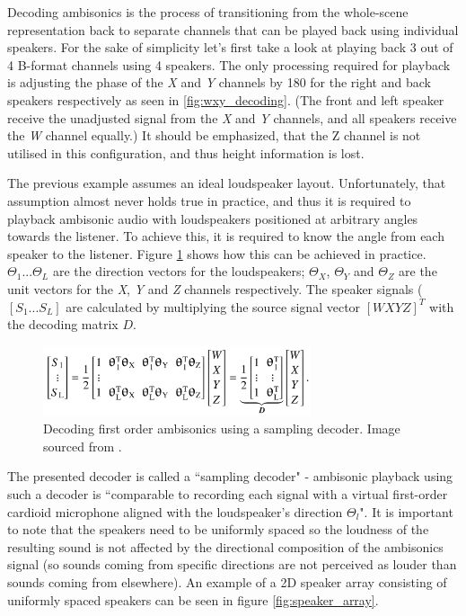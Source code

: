 Decoding ambisonics is the process of transitioning from the whole-scene representation 
back to separate channels that can be played back using individual speakers.
For the sake of simplicity let's first take a look at playing back 3 out of 4 B-format channels using 4 speakers. 
The only processing required for playback is adjusting the phase of the \emph{X} and \emph{Y} channels by 180\degree{} 
for the right and back speakers respectively as seen in \ref{fig:wxy_decoding}. 
(The front and left speaker receive the unadjusted signal from the \emph{X} and \emph{Y} channels, and all speakers receive the \emph{W} channel equally.)
It should be emphasized, that the Z channel is not utilised in this configuration, and thus height information is lost.

The previous example assumes an ideal loudspeaker layout. Unfortunately, that assumption almost never holds true in practice, 
and thus it is required to playback ambisonic audio with loudspeakers positioned at arbitrary angles towards the listener.
To achieve this, it is required to know the angle from each speaker to the listener. 
Figure \ref{fig:3d_sampling_decoder_equation} shows how this can be achieved in practice. 
$\Theta_1 ... \Theta_L$ are the direction vectors for the loudspeakers; 
$\Theta_X$, $\Theta_Y$ and $\Theta_Z$ are the unit vectors for the 
\emph{X}, \emph{Y} and \emph{Z} channels respectively. 
The speaker signals ($[S_1 ... S_L]$ are calculated by multiplying 
the source signal vector $[W X Y Z]^T$ with the decoding matrix $D$. \cite{ambisonics_practical_theory}

\begin{figure}[!ht]
    \centering
    \includegraphics[width=0.7\textwidth]{images/spatial_audio/3d_sampling_decoder_equation.png}
    \caption{Decoding first order ambisonics using a sampling decoder.
        Image sourced from \cite{ambisonics_practical_theory}.
        \label{fig:3d_sampling_decoder_equation}}
\end{figure}

The presented decoder is called a ``sampling decoder" - ambisonic playback using such a decoder is ``comparable
to recording each signal with a virtual first-order cardioid microphone aligned with the loudspeaker's
direction $\Theta_l$". \cite{ambisonics_practical_theory} It is important to note that the speakers need to be uniformly spaced 
so the loudness of the resulting sound is not affected by the directional 
composition of the ambisonics signal
(so sounds coming from specific directions are not perceived as louder than sounds coming from elsewhere). 
An example of a 2D speaker array consisting of uniformly spaced speakers can be seen in figure \ref{fig:speaker_array}.

